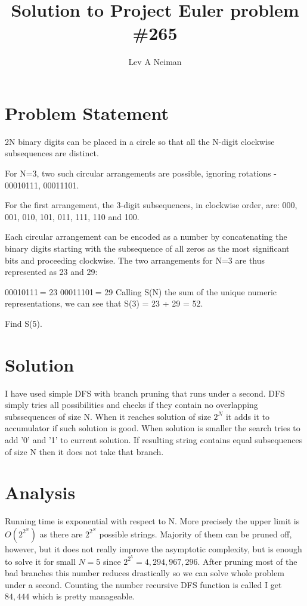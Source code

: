 \documentclass[11pt]{article}
\begin{document}
\title{Solution to Project Euler problem \#265}
\author{Lev A Neiman}

\maketitle

\section{Problem Statement}

2N binary digits can be placed in a circle so that all the N-digit clockwise subsequences are distinct.

For N=3, two such circular arrangements are possible, ignoring rotations - 00010111, 00011101.

For the first arrangement, the 3-digit subsequences, in clockwise order, are:
000, 001, 010, 101, 011, 111, 110 and 100.

Each circular arrangement can be encoded as a number by concatenating the binary digits starting with the subsequence of all zeros as the most significant bits and proceeding clockwise. The two arrangements for N=3 are thus represented as 23 and 29:

00010111 = 23
00011101 = 29
Calling S(N) the sum of the unique numeric representations, we can see that S(3) = 23 + 29 = 52.

Find S(5).

\section{Solution}

I have used simple DFS with branch pruning that runs under a second.  DFS simply tries all possibilities and checks if they contain no overlapping subssequences of size N.  When it reaches solution of size $ 2^{N} $ it adds it to accumulator if such solution is good.  When solution is smaller the search tries to add '0' and '1' to current solution.  If resulting string contains equal subsequences of size N then it does not take that branch.  

\section{Analysis}

Running time is exponential with respect to N.  More precisely the upper limit is $ O(2^{2^{N}}) $ as there are $ 2^{2^{N}} $ possible strings.  Majority of them can be pruned off, however, but it does not really improve the asymptotic complexity, but is enough to solve it for small $ N = 5 $ since $ 2^{2^{5}} = 4,294,967,296 $.  After pruning most of the bad branches this number reduces drastically so we can solve whole problem under a second.  Counting the number recursive DFS function is called I get $ 84,444 $ which is pretty manageable.  
\end{document}
